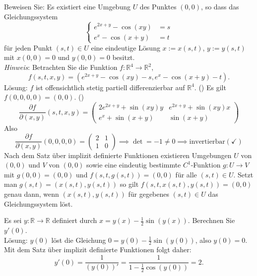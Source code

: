 Beweisen Sie:
Es existiert eine Umgebung $U$ des Punktes $(0,0)$, so dass das Gleichungssystem
\begin{displaymath}
  \begin{cases}
    e^{2x + y} - \cos(xy) &= s\\
    e^x - \cos(x + y) &= t
  \end{cases}
\end{displaymath}
für jeden Punkt $(s,t) \in U$ eine eindeutige Lösung $x := x(s,t)$, $y := y(s,t)$ mit $x(0,0) = 0$ und $y(0,0) = 0$ besitzt.\\
\textit{Hinweis}: Betrachten Sie die Funktion $f : \mathbb{R}^4 \to \mathbb{R}^2$,
\begin{displaymath}
  f(s,t,x,y) = (e^{2x + y} - \cos(xy) - s, e^{x} - \cos(x + y) - t).
\end{displaymath}
Lösung:
$f$ ist offensichtlich stetig partiell differenzierbar auf $\mathbb{R}^4$. (\checkmark)
Es gilt $f(0,0,0,0) = (0,0)$. (\checkmark)
\begin{displaymath}
  \frac{\partial f}{\partial (x,y)} (s,t,x,y) =
  \begin{pmatrix}
    2e^{2x + y} + \sin(xy)y & e^{2x+y} + \sin(xy)x\\
    e^x + \sin(x + y) & \sin(x + y)
  \end{pmatrix}
\end{displaymath}
Also
\begin{displaymath}
  \frac{\partial f}{\partial (x,y)} (0,0,0,0) =
  \begin{pmatrix}
    2 & 1\\
    1 & 0
  \end{pmatrix}
  \implies \det = -1 \neq 0 \implies \text{invertierbar} (\checkmark)
\end{displaymath}
Nach dem Satz über implizit definierte Funktionen existieren Umgebungen $U$ von $(0,0)$ und $V$ von $(0,0)$ sowie eine eindeutig bestimmte $C^1$-Funktion $g : U \to V$ mit $g(0,0) = (0,0)$ und $f(s,t,g(s,t)) = (0,0)$ für alle $(s,t) \in U$.
Setzt man $g(s,t) = (x(s,t), y(s,t))$ so gilt $f(s,t,x(s,t), y(s,t)) = (0,0)$ genau dann, wenn $(x(s,t), y(s,t))$ für gegebenes $(s,t) \in U$ das Gleichungssystem löst.

Es sei $y : \mathbb{R} \to \mathbb{R}$ definiert durch $x = y(x) - \frac{1}{2} \sin(y(x))$.
Berechnen Sie $y'(0)$.\\
Lösung: 
$y(0)$ löst die Gleichung $0 = y(0) - \frac{1}{2}\sin(y(0))$, also $y(0) = 0$.
Mit dem Satz über implizit definierte Funktionen folgt daher:
\begin{displaymath}
  y'(0) = \frac{1}{(y(0))'} = \frac{1}{1 - \frac{1}{2} \cos(y(0))} = 2.
\end{displaymath}

